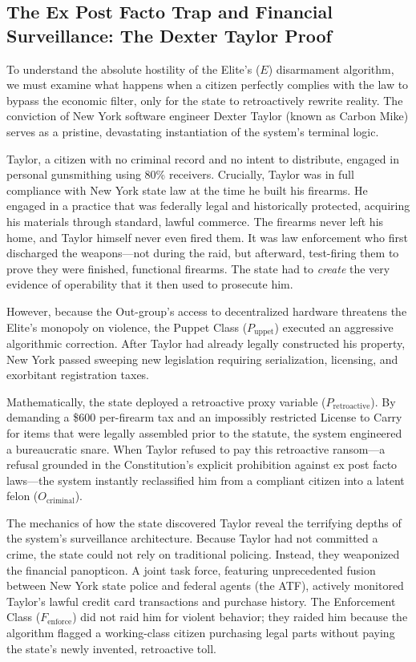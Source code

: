 \documentclass[12pt,openany]{book}
\begin{document}
\subsection{The Ex Post Facto Trap and Financial Surveillance: The Dexter Taylor Proof}
\label{sec:dexter_taylor}

To understand the absolute hostility of the Elite's ($E$) disarmament algorithm, we must examine what happens when a citizen perfectly complies with the law to bypass the economic filter, only for the state to retroactively rewrite reality. The conviction of New York software engineer Dexter Taylor (known as Carbon Mike) serves as a pristine, devastating instantiation of the system's terminal logic.

Taylor, a citizen with no criminal record and no intent to distribute, engaged in personal gunsmithing using 80\% receivers. Crucially, Taylor was in full compliance with New York state law at the time he built his firearms. He engaged in a practice that was federally legal and historically protected, acquiring his materials through standard, lawful commerce. The firearms never left his home, and Taylor himself never even fired them. It was law enforcement who first discharged the weapons---not during the raid, but afterward, test-firing them to prove they were finished, functional firearms. The state had to \textit{create} the very evidence of operability that it then used to prosecute him.

However, because the Out-group's access to decentralized hardware threatens the Elite's monopoly on violence, the Puppet Class ($P_{\text{uppet}}$) executed an aggressive algorithmic correction. After Taylor had already legally constructed his property, New York passed sweeping new legislation requiring serialization, licensing, and exorbitant registration taxes.

Mathematically, the state deployed a retroactive proxy variable ($P_{\text{retroactive}}$). By demanding a \$600 per-firearm tax and an impossibly restricted License to Carry for items that were legally assembled prior to the statute, the system engineered a bureaucratic snare. When Taylor refused to pay this retroactive ransom---a refusal grounded in the Constitution's explicit prohibition against ex post facto laws---the system instantly reclassified him from a compliant citizen into a latent felon ($O_{\text{criminal}}$).

The mechanics of how the state discovered Taylor reveal the terrifying depths of the system's surveillance architecture. Because Taylor had not committed a crime, the state could not rely on traditional policing. Instead, they weaponized the financial panopticon. A joint task force, featuring unprecedented fusion between New York state police and federal agents (the ATF), actively monitored Taylor's lawful credit card transactions and purchase history. The Enforcement Class ($F_{\text{enforce}}$) did not raid him for violent behavior; they raided him because the algorithm flagged a working-class citizen purchasing legal parts without paying the state's newly invented, retroactive toll.
\end{document}
